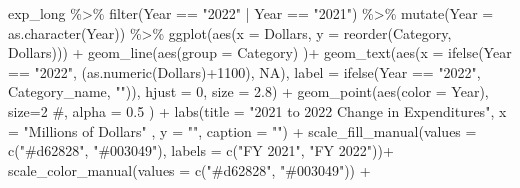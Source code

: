\documentclass[
  letterpaper,
  DIV=11,
  numbers=noendperiod]{scrreport}
\newenvironment{Shaded}{\begin{snugshade}}{\end{snugshade}}
\newcommand{\AttributeTok}[1]{\textcolor[rgb]{0.40,0.45,0.13}{#1}}
\newcommand{\CommentTok}[1]{\textcolor[rgb]{0.37,0.37,0.37}{#1}}
\newcommand{\ConstantTok}[1]{\textcolor[rgb]{0.56,0.35,0.01}{#1}}
\newcommand{\DecValTok}[1]{\textcolor[rgb]{0.68,0.00,0.00}{#1}}
\newcommand{\FloatTok}[1]{\textcolor[rgb]{0.68,0.00,0.00}{#1}}
\newcommand{\FunctionTok}[1]{\textcolor[rgb]{0.28,0.35,0.67}{#1}}
\newcommand{\NormalTok}[1]{\textcolor[rgb]{0.00,0.23,0.31}{#1}}
\newcommand{\SpecialCharTok}[1]{\textcolor[rgb]{0.37,0.37,0.37}{#1}}
\newcommand{\StringTok}[1]{\textcolor[rgb]{0.13,0.47,0.30}{#1}}
\begin{document}
\begin{Shaded}
\begin{Highlighting}[]
\NormalTok{exp\_long }\SpecialCharTok{\%\textgreater{}\%}
    \FunctionTok{filter}\NormalTok{(Year }\SpecialCharTok{==} \StringTok{"2022"} \SpecialCharTok{|}\NormalTok{ Year }\SpecialCharTok{==} \StringTok{"2021"}\NormalTok{) }\SpecialCharTok{\%\textgreater{}\%}
  \FunctionTok{mutate}\NormalTok{(}\AttributeTok{Year =} \FunctionTok{as.character}\NormalTok{(Year)) }\SpecialCharTok{\%\textgreater{}\%}
  \FunctionTok{ggplot}\NormalTok{(}\FunctionTok{aes}\NormalTok{(}\AttributeTok{x =}\NormalTok{ Dollars, }\AttributeTok{y =} \FunctionTok{reorder}\NormalTok{(Category, Dollars))) }\SpecialCharTok{+}
  \FunctionTok{geom\_line}\NormalTok{(}\FunctionTok{aes}\NormalTok{(}\AttributeTok{group =}\NormalTok{ Category) )}\SpecialCharTok{+}
  \FunctionTok{geom\_text}\NormalTok{(}\FunctionTok{aes}\NormalTok{(}\AttributeTok{x =} \FunctionTok{ifelse}\NormalTok{(Year }\SpecialCharTok{==} \StringTok{"2022"}\NormalTok{, (}\FunctionTok{as.numeric}\NormalTok{(Dollars)}\SpecialCharTok{+}\DecValTok{1100}\NormalTok{), }\ConstantTok{NA}\NormalTok{),  }
                \AttributeTok{label =} \FunctionTok{ifelse}\NormalTok{(Year }\SpecialCharTok{==} \StringTok{"2022"}\NormalTok{, Category\_name, }\StringTok{""}\NormalTok{)),  }
            \AttributeTok{hjust =} \DecValTok{0}\NormalTok{,}
            \AttributeTok{size =} \FloatTok{2.8}\NormalTok{) }\SpecialCharTok{+}
  \FunctionTok{geom\_point}\NormalTok{(}\FunctionTok{aes}\NormalTok{(}\AttributeTok{color =}\NormalTok{ Year), }\AttributeTok{size=}\DecValTok{2} \CommentTok{\#, alpha = 0.5}
\NormalTok{             )  }\SpecialCharTok{+}
  \FunctionTok{labs}\NormalTok{(}\AttributeTok{title =} \StringTok{"2021 to 2022 Change in Expenditures"}\NormalTok{, }\AttributeTok{x =} \StringTok{"Millions of Dollars"}\NormalTok{ , }\AttributeTok{y =} \StringTok{""}\NormalTok{,  }\AttributeTok{caption =} \StringTok{""}\NormalTok{)  }\SpecialCharTok{+}
   \FunctionTok{scale\_fill\_manual}\NormalTok{(}\AttributeTok{values =} \FunctionTok{c}\NormalTok{(}\StringTok{"\#d62828"}\NormalTok{, }\StringTok{"\#003049"}\NormalTok{), }\AttributeTok{labels =} \FunctionTok{c}\NormalTok{(}\StringTok{"FY 2021"}\NormalTok{, }\StringTok{"FY 2022"}\NormalTok{))}\SpecialCharTok{+}
    \FunctionTok{scale\_color\_manual}\NormalTok{(}\AttributeTok{values =} \FunctionTok{c}\NormalTok{(}\StringTok{"\#d62828"}\NormalTok{, }\StringTok{"\#003049"}\NormalTok{)) }\SpecialCharTok{+}


\end{Highlighting}
\end{Shaded}
\end{document}
